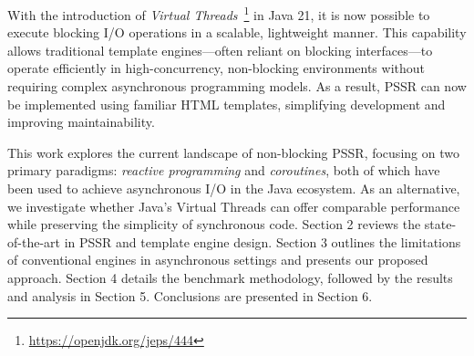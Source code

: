 With the introduction of \textit{Virtual Threads}~\footnote{\url{https://openjdk.org/jeps/444}}
in Java 21, it is now possible to execute blocking I/O operations in a
scalable, lightweight manner. This capability allows traditional template
engines—often reliant on blocking interfaces—to operate efficiently in
high-concurrency, non-blocking environments without requiring complex
asynchronous programming models. As a result, PSSR
can now be implemented using familiar HTML templates, 
simplifying development and improving maintainability.

This work explores the current landscape of non-blocking PSSR, focusing on two
primary paradigms: \textit{reactive programming} and \textit{coroutines}, both
of which have been used to achieve asynchronous I/O in the Java ecosystem. As an
alternative, we investigate whether Java’s Virtual Threads can offer comparable
performance while preserving the simplicity of synchronous code. Section 2
reviews the state-of-the-art in PSSR and template engine design. Section 3
outlines the limitations of conventional engines in asynchronous settings and
presents our proposed approach. Section 4 details the benchmark methodology,
followed by the results and analysis in Section 5. Conclusions are presented in Section 6.